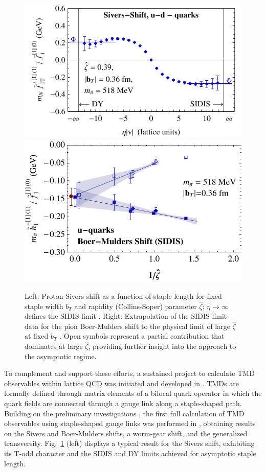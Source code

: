 \begin{figure}[h!]
	\centering
	\includegraphics[width=0.474\columnwidth]{figures/m020_run38_UminusD_Sivers_lsqr-9_zetasqrlat4}\hspace{1cm}
	\includegraphics[width=0.45\columnwidth]{figures/new_bm_u_sidis_b0p36_vszetahat_extrap_pow1}
	\caption{Left: Proton Sivers shift as a function of staple length for fixed
		staple width $b_T $ and rapidity (Collins-Soper) parameter $\hat{\zeta } $;
		$\eta \rightarrow \infty $ defines the SIDIS limit \cite{Musch:2011er}.
		Right: Extrapolation of the SIDIS limit data for the pion Boer-Mulders
		shift to the physical limit of large $\hat{\zeta } $
		at fixed $b_T $ \cite{Engelhardt:2015xja}. Open symbols represent a partial
		contribution that dominates at large $\hat{\zeta } $, providing further
		insight into the approach to the asymptotic regime.}
	\label{fig_sidis}
\end{figure}

To complement and support these efforts, a sustained
project to calculate TMD observables within lattice QCD was initiated
and developed in \cite{Hagler:2009mb,Musch:2010ka,Musch:2011er,Engelhardt:2015xja,Yoon:2017qzo,Engelhardt:2017miy}.
TMDs are formally defined through matrix elements of a bilocal quark
operator in which the quark fields are connected through a gauge link
along a staple-shaped path. Building on the preliminary investigations
\cite{Hagler:2009mb,Musch:2010ka}, the first full calculation of TMD
observables using staple-shaped gauge links was performed in
\cite{Musch:2011er}, obtaining results on the Sivers and Boer-Mulders
shifts, a worm-gear shift, and the generalized transversity.
Fig.~\ref{fig_sidis} (left) displays a typical result for the Sivers
shift, exhibiting its T-odd character and the SIDIS and DY limits
achieved for asymptotic staple length.

